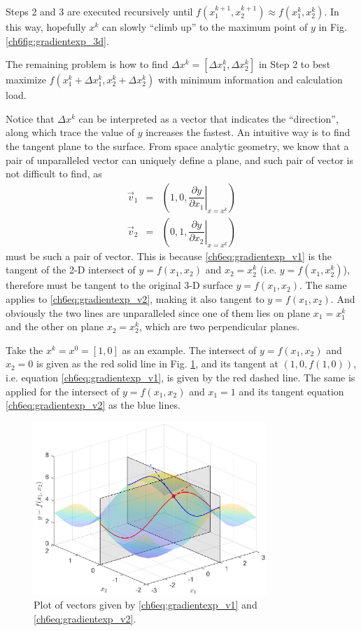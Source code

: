 Steps 2 and 3 are executed recursively until $f(x_1^{k+1}, x_2^{k+1}) \approx f(x_1^k, x_2^k)$. In this way, hopefully $x^k$ can slowly ``climb up'' to the maximum point of $y$ in Fig. \ref{ch6fig:gradientexp_3d}.

The remaining problem is how to find $\Delta x^k = [\Delta x_1^k, \Delta x_2^k]$ in Step 2 to best maximize $f(x_1^k+\Delta x_1^k, x_2^k+\Delta x_2^k)$ with minimum information and calculation load.

Notice that $\Delta x^k$ can be interpreted as a vector that indicates the ``direction'', along which trace the value of $y$ increases the fastest. An intuitive way is to find the tangent plane to the surface. From space analytic geometry, we know that a pair of unparalleled vector can uniquely define a plane, and such pair of vector is not difficult to find, as
\begin{eqnarray}
 \vec{v}_1 &=& \left(1,0,\left.\dfrac{\partial y}{\partial x_1}\right|_{x=x^k}\right) \label{ch6eq:gradientexp_v1} \\
 \vec{v}_2 &=& \left(0,1,\left.\dfrac{\partial y}{\partial x_2}\right|_{x=x^k}\right) \label{ch6eq:gradientexp_v2}
\end{eqnarray}
must be such a pair of vector. This is because \eqref{ch6eq:gradientexp_v1} is the tangent of the 2-D intersect of $y=f(x_1,x_2)$ and $x_2 = x_2^k$ (i.e. $y=f(x_1,x_2^k)$), therefore must be tangent to the original 3-D surface $y=f(x_1,x_2)$. The same applies to \eqref{ch6eq:gradientexp_v2}, making it also tangent to $y=f(x_1,x_2)$. And obviously the two lines are unparalleled since one of them lies on plane $x_1=x_1^k$ and the other on plane $x_2=x_2^k$, which are two perpendicular planes.

Take the $x^k=x^0=[1,0]$ as an example. The intersect of $y=f(x_1,x_2)$ and $x_2 = 0$ is given as the red solid line in Fig. \ref{ch6fig:gradientexp_3d2}, and its tangent at $\left(1,0,f(1,0)\right)$, i.e. equation \eqref{ch6eq:gradientexp_v1}, is given by the red dashed line. The same is applied for the intersect of $y=f(x_1,x_2)$ and $x_1 = 1$ and its tangent equation \eqref{ch6eq:gradientexp_v2} as the blue lines.

\begin{figure}
	\centering
	\includegraphics[width=250pt]{chapters/chapter6/figures/gradientexp_3d2.eps}
	\caption{Plot of vectors given by \eqref{ch6eq:gradientexp_v1} and \eqref{ch6eq:gradientexp_v2}.} \label{ch6fig:gradientexp_3d2}
\end{figure}

